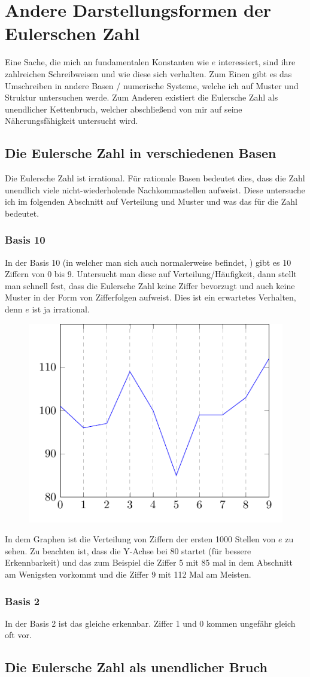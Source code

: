 \section{Andere Darstellungsformen der Eulerschen Zahl}
Eine Sache, die mich an fundamentalen Konstanten wie $e$ interessiert, sind ihre zahlreichen Schreibweisen und wie diese sich verhalten. Zum Einen gibt es das Umschreiben in andere Basen / numerische Systeme, welche ich auf Muster und Struktur untersuchen werde. Zum Anderen existiert die Eulersche Zahl als unendlicher Kettenbruch, welcher abschließend von mir auf seine Näherungsfähigkeit untersucht wird. \subsection{Die Eulersche Zahl in verschiedenen Basen}
Die Eulersche Zahl ist irrational. Für rationale Basen bedeutet dies, dass die Zahl unendlich viele nicht-wiederholende Nachkommastellen aufweist. Diese untersuche ich im folgenden Abschnitt auf Verteilung und Muster und was das für die Zahl bedeutet.
\subsubsection{Basis 10}
In der Basis 10 (in welcher man sich auch normalerweise befindet, ) gibt es 10 Ziffern von 0 bis 9. Untersucht man diese auf Verteilung/Häufigkeit, dann stellt man schnell fest, dass die Eulersche Zahl keine Ziffer bevorzugt und auch keine Muster in der Form von Zifferfolgen aufweist. Dies ist ein erwartetes Verhalten, denn $e$ ist ja irrational.
\begin{figure}[h]
  \includegraphics{medien2/basis10/basis10.pdf}
  \centering
\end{figure}
\par In dem Graphen ist die Verteilung von Ziffern der ersten 1000 Stellen von $e$ zu sehen. Zu beachten ist, dass die Y-Achse bei 80 startet (für bessere Erkennbarkeit) und das zum Beispiel die Ziffer 5 mit 85 mal in dem Abschnitt am Wenigsten vorkommt und die Ziffer 9 mit 112 Mal am Meisten.
\subsubsection{Basis 2}
In der Basis 2 ist das gleiche erkennbar. Ziffer 1 und 0 kommen ungefähr gleich oft vor. \subsection{Die Eulersche Zahl als unendlicher Bruch}

